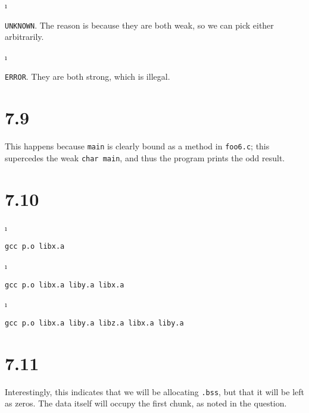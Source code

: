 \documentclass[fleqn]{article}
\begin{document}
\i
\begin{solution}
\texttt{UNKNOWN}. The reason is because they are both weak, so we can pick either arbitrarily.
\end{solution}

\i
\begin{solution}
\texttt{ERROR}. They are both strong, which is illegal. 
\end{solution}

\ene

\section{7.9}

\begin{solution}
This happens because \texttt{main} is clearly bound as a method in \texttt{foo6.c}; this supercedes the weak \texttt{char main}, and thus the program prints the odd result.
\end{solution}

\section{7.10}

\bee

\i
\begin{solution}
\texttt{gcc p.o libx.a}
\end{solution}

\i
\begin{solution}
\texttt{gcc p.o libx.a liby.a libx.a}
\end{solution}

\i
\begin{solution}
\texttt{gcc p.o libx.a liby.a libz.a libx.a liby.a}
\end{solution}

\ene

\section{7.11}
\begin{solution}
Interestingly, this indicates that we will be allocating \texttt{.bss}, but that it will be left as zeros. The data itself will occupy the first chunk, as noted in the question.
\end{solution}
\end{document}
